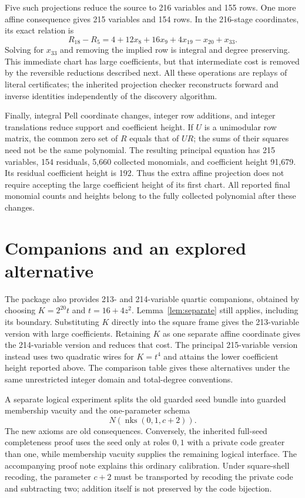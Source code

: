\documentclass[11pt]{article}
\theoremstyle{definition}\newtheorem{remark}[theorem]{Remark}
\begin{document}
Five such projections reduce the source to 216 variables and 155 rows.
One more affine consequence gives 215 variables and 154 rows. In the
216-stage coordinates, its exact relation is
\[
       R_{18}-R_5=4+12x_8+16x_9+4x_{19}-x_{20}+x_{33}.
\]
Solving for $x_{33}$ and removing the implied row is integral and degree
preserving. This immediate chart has large coefficients, but that
intermediate cost is removed by the reversible reductions described next.
All these operations are replays of literal certificates; the inherited
projection checker reconstructs forward and inverse identities independently
of the discovery algorithm.

Finally, integral Pell coordinate changes, integer row additions, and
integer translations reduce support and coefficient height. If $U$ is a
unimodular row matrix, the common zero set of $R$ equals that of $UR$;
the sums of their squares need not be the same polynomial. The resulting
principal equation has 215 variables, 154 residuals, 5,660 collected
monomials, and coefficient height 91,679. Its residual coefficient height
is 192. Thus the extra affine projection does not require accepting the
large coefficient height of its first chart. All reported final monomial
counts and heights belong to the fully collected polynomial after these
changes.

\section{Companions and an explored alternative}

The package also provides 213- and 214-variable quartic companions,
obtained by choosing $K=2^{20}t$ and $t=16+4z^2$.
Lemma~\ref{lem:separate} still applies, including its boundary.
Substituting $K$ directly into the square frame gives the 213-variable
version with large coefficients. Retaining $K$ as one separate affine
coordinate gives the 214-variable version and reduces that cost.
The principal 215-variable version instead uses two quadratic wires for
$K=t^4$ and attains the lower coefficient height reported above.
The comparison table gives these alternatives under the same unrestricted
integer domain and total-degree conventions.

A separate logical experiment splits the old guarded seed bundle into
guarded membership vacuity and the one-parameter schema
\[
             N(\operatorname{nks}(0,1,c+2)).
\]
The new axioms are old consequences. Conversely, the inherited full-seed
completeness proof uses the seed only at roles $0,1$ with a private code
greater than one, while membership vacuity supplies the remaining logical
interface. The accompanying proof note explains this ordinary calibration.
Under square-shell recoding, the parameter $c+2$ must be transported by
recoding the private code and subtracting two; addition itself is not
preserved by the code bijection.
\end{document}
